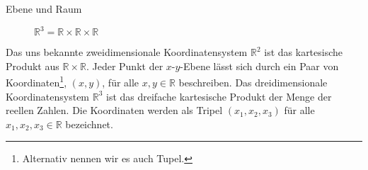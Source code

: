 \theoremstyle{example}
\begin{example}{Ebene und Raum} \label{KoS}
\begin{figure}[h]
\begin{minipage}[t]{.5\textwidth}
\captionsetup{singlelinecheck=off}
\caption{$\mathbb{R}^2=\mathbb{R} \times \mathbb{R}$}
\end{minipage}
\hfill
\begin{minipage}[t]{.45\textwidth}
\caption{$\mathbb{R}^3=\mathbb{R} \times \mathbb{R} \times \mathbb{R}$}
\end{minipage}
\end{figure}
Das uns bekannte zweidimensionale Koordinatensystem $\mathbb{R}^2$ ist das kartesische Produkt aus \(\mathbb{R} \times \mathbb{R}\). Jeder Punkt der $x$-$y$-Ebene lässt sich durch ein {\glqq}Paar von Koordinaten\footnote{Alternativ nennen wir es auch Tupel.}, $(x, y)$,{\grqq} \cite[S. 28]{Enzy} für alle ${x, y\in \mathbb{R}}$ beschreiben. Das dreidimensionale Koordinatensystem $\mathbb{R}^3$ ist das dreifache kartesische Produkt der Menge der reellen Zahlen. Die Koordinaten werden als {\glqq}Tripel{\grqq}  \cite[S. 28]{Enzy} $(x_1, x_2, x_3)$ für alle $x_1, x_2, x_3\in \mathbb{R}$ bezeichnet.
\end{example}

